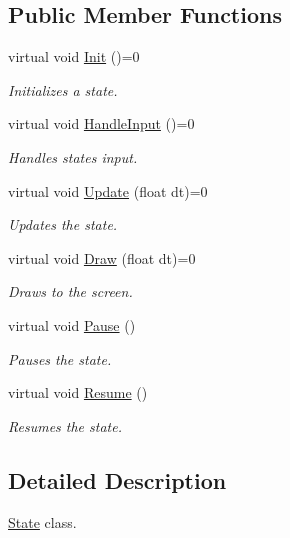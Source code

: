\subsection*{Public Member Functions}
\begin{DoxyCompactItemize}
\item 
virtual void \mbox{\hyperlink{class_states_1_1_state_aff396dd3b4f3f7f7e729a0eac1910f45}{Init}} ()=0
\begin{DoxyCompactList}\small\item\em Initializes a state. \end{DoxyCompactList}\item 
virtual void \mbox{\hyperlink{class_states_1_1_state_a9f5a1461456ad43c936808c9cfb9e8bd}{Handle\+Input}} ()=0
\begin{DoxyCompactList}\small\item\em Handles state\textquotesingle{}s input. \end{DoxyCompactList}\item 
virtual void \mbox{\hyperlink{class_states_1_1_state_ab8e935def8138e0b917c3228a29904e4}{Update}} (float dt)=0
\begin{DoxyCompactList}\small\item\em Updates the state. \end{DoxyCompactList}\item 
virtual void \mbox{\hyperlink{class_states_1_1_state_af5faf0a12478e595ec488fa6108fa490}{Draw}} (float dt)=0
\begin{DoxyCompactList}\small\item\em Draws to the screen. \end{DoxyCompactList}\item 
virtual void \mbox{\hyperlink{class_states_1_1_state_aa6e8c4d6cba7b9a01f041e135babe2c4}{Pause}} ()
\begin{DoxyCompactList}\small\item\em Pauses the state. \end{DoxyCompactList}\item 
virtual void \mbox{\hyperlink{class_states_1_1_state_a6051e49b660cf6e35baf28b25892a91b}{Resume}} ()
\begin{DoxyCompactList}\small\item\em Resumes the state. \end{DoxyCompactList}\end{DoxyCompactItemize}


\subsection{Detailed Description}
\mbox{\hyperlink{class_states_1_1_state}{State}} class. 

